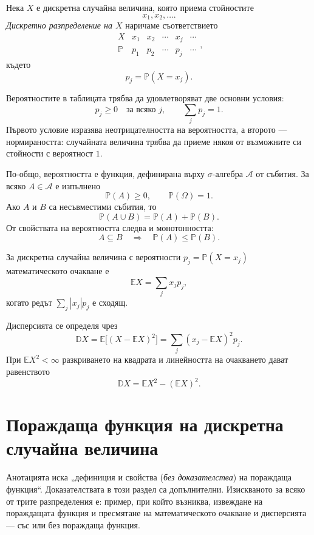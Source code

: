 \begin{defn}
Нека $X$ е дискретна случайна величина, която приема стойностите
\[
x_1,x_2,\ldots .
\]
\emph{Дискретно разпределение на $X$} наричаме съответствието
\[
\begin{array}{c|ccccc}
X & x_1 & x_2 & \cdots & x_j & \cdots\\
\hline
\mathbb{P} & p_1 & p_2 & \cdots & p_j & \cdots
\end{array},
\]
където
\[
p_j=\mathbb{P}(X=x_j).
\]
\end{defn}

Вероятностите в таблицата трябва да удовлетворяват две основни условия:
\[
p_j\geq 0\quad\text{за всяко }j,
\qquad
\sum_j p_j=1.
\]
Първото условие изразява неотрицателността на вероятността, а второто --- нормираността: случайната величина трябва да приеме някоя от възможните си стойности с вероятност $1$.

По-общо, вероятността е функция, дефинирана върху $\sigma$-алгебра $\mathcal{A}$ от събития. За всяко $A\in\mathcal{A}$ е изпълнено
\[
\mathbb{P}(A)\geq 0,
\qquad
\mathbb{P}(\Omega)=1.
\]
Ако $A$ и $B$ са несъвместими събития, то
\[
\mathbb{P}(A\cup B)=\mathbb{P}(A)+\mathbb{P}(B).
\]
От свойствата на вероятността следва и монотонността:
\[
A\subseteq B\quad\Longrightarrow\quad \mathbb{P}(A)\leq \mathbb{P}(B).
\]

\begin{defn}
За дискретна случайна величина с вероятности $p_j=\mathbb{P}(X=x_j)$ математическото очакване е
\[
\mathbb{E}X=\sum_j x_jp_j,
\]
когато редът $\sum_j |x_j|p_j$ е сходящ.
\end{defn} \begin{defn}[Дисперсия]
Дисперсията се определя чрез
\[
\mathbb{D}X=\mathbb{E}\bigl[(X-\mathbb{E}X)^2\bigr]
=\sum_j (x_j-\mathbb{E}X)^2p_j.
\]
При $\mathbb E X^2<\infty$ разкриването на квадрата и линейността на очакването дават равенството
\[
\mathbb{D}X=\mathbb{E}X^2-(\mathbb{E}X)^2.
\]
\end{defn}

\section{Пораждаща функция на дискретна случайна величина}\label{s:35.2}

\begin{supp}
Анотацията иска „дефиниция и свойства (\emph{без доказателства}) на пораждаща
функция“. Доказателствата в този раздел са допълнителни. Изискваното за всяко от
трите разпределения е: пример, при който възниква, извеждане на пораждащата
функция и пресмятане на математическото очакване и дисперсията --- със или без
пораждаща функция.
\end{supp}

